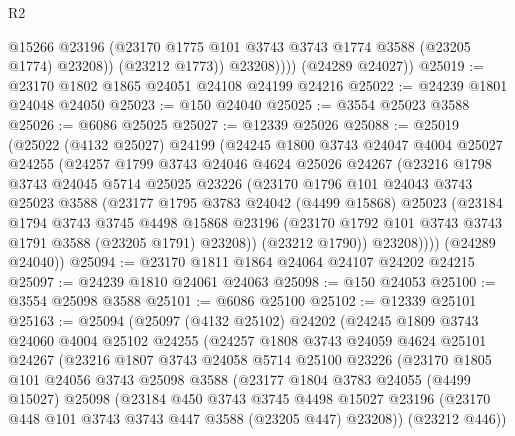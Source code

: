 \begin{lexlean}{R2}
\begin{coremodule}
                  @15266
                  @23196
                  (@23170 @1775 @101 @3743 @3743 @1774 @3588 (@23205 @1774) @23208))
                (@23212 @1773))
              @23208))))
      (@24289 @24027))
@25019 := @23170 @1802 @1865 @24051 @24108 @24199 @24216
@25022 := @24239 @1801 @24048 @24050
@25023 := @150 @24040
@25025 := @3554 @25023 @3588
@25026 := @6086 @25025
@25027 := @12339 @25026
@25088 := @25019
    (@25022
      (@4132 @25027)
      @24199
      (@24245
        @1800
        @3743
        @24047
        @4004
        @25027
        @24255
        (@24257
          @1799
          @3743
          @24046
          @4624
          @25026
          @24267
          (@23216
            @1798
            @3743
            @24045
            @5714
            @25025
            @23226
            (@23170
              @1796
              @101
              @24043
              @3743
              @25023
              @3588
              (@23177
                @1795
                @3783
                @24042
                (@4499 @15868)
                @25023
                (@23184
                  @1794
                  @3743
                  @3745
                  @4498
                  @15868
                  @23196
                  (@23170 @1792 @101 @3743 @3743 @1791 @3588 (@23205 @1791) @23208))
                (@23212 @1790))
              @23208))))
      (@24289 @24040))
@25094 := @23170 @1811 @1864 @24064 @24107 @24202 @24215
@25097 := @24239 @1810 @24061 @24063
@25098 := @150 @24053
@25100 := @3554 @25098 @3588
@25101 := @6086 @25100
@25102 := @12339 @25101
@25163 := @25094
    (@25097
      (@4132 @25102)
      @24202
      (@24245
        @1809
        @3743
        @24060
        @4004
        @25102
        @24255
        (@24257
          @1808
          @3743
          @24059
          @4624
          @25101
          @24267
          (@23216
            @1807
            @3743
            @24058
            @5714
            @25100
            @23226
            (@23170
              @1805
              @101
              @24056
              @3743
              @25098
              @3588
              (@23177
                @1804
                @3783
                @24055
                (@4499 @15027)
                @25098
                (@23184
                  @450
                  @3743
                  @3745
                  @4498
                  @15027
                  @23196
                  (@23170 @448 @101 @3743 @3743 @447 @3588 (@23205 @447) @23208))
                (@23212 @446))

\end{coremodule}
\end{lexlean}
